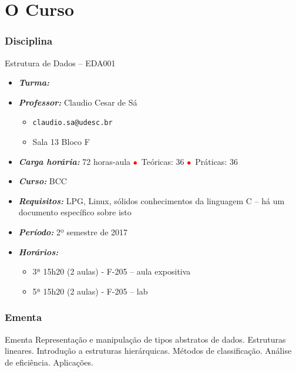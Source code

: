 
\section{O Curso}
\begin{frame}


\frametitle{Disciplina}

\begin{block}{Estrutura de Dados -- EDA001}

\begin{itemize}
\item \emph{\textbf{Turma:}} 
\item \emph{\textbf{Professor:}} Claudio Cesar de Sá
  \begin{itemize}
  \item \texttt{claudio.sa@udesc.br}
  \item Sala 13 Bloco F
  \end{itemize}
\item \emph{\textbf{Carga horária:}} 72 horas-aula 
\textcolor{red}{$\bullet$}~Teóricas: 36 \textcolor{red}{$\bullet$}~Práticas: 36
\item \emph{\textbf{Curso:}} BCC
\item \emph{\textbf{Requisitos:}} LPG, Linux, sólidos conhecimentos da linguagem C -- há um documento específico sobre isto
\item \emph{\textbf{Período:}} 2º semestre de 2017
\item \emph{\textbf{Horários:}}
  \begin{itemize}
  \item 3ª 15h20 (2 aulas) - F-205  -- aula expositiva
  \item 5ª 15h20 (2 aulas) - F-205 -- lab
  
  \end{itemize}

\end{itemize}

\end{block}

\end{frame}


\begin{frame}
\frametitle{Ementa}

\begin{block}{Ementa}
Representação e manipulação de tipos abstratos de dados. Estruturas lineares. 
Introdução a estruturas hierárquicas. Métodos de classificação. Análise de eficiência. Aplicações.
\end{block}

\end{frame}

